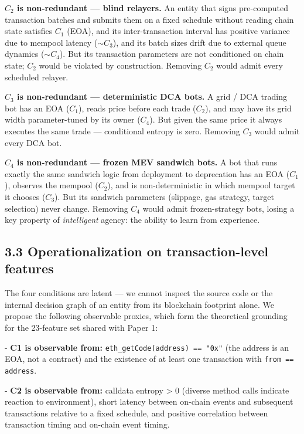 \documentclass[sigconf,nonacm=false]{acmart}
\begin{document}
\textbf{$C_2$ is non-redundant --- blind relayers.} An entity that signs pre-computed transaction batches and submits them on a fixed schedule without reading chain state satisfies $C_1$ (EOA), and its inter-transaction interval has positive variance due to mempool latency ($\sim C_3$), and its batch sizes drift due to external queue dynamics ($\sim C_4$). But its transaction parameters are not conditioned on chain state; $C_2$ would be violated by construction. Removing $C_2$ would admit every scheduled relayer.

\textbf{$C_3$ is non-redundant --- deterministic DCA bots.} A grid / DCA trading bot has an EOA ($C_1$), reads price before each trade ($C_2$), and may have its grid width parameter-tuned by its owner ($C_4$). But given the same price it always executes the same trade --- conditional entropy is zero. Removing $C_3$ would admit every DCA bot.

\textbf{$C_4$ is non-redundant --- frozen MEV sandwich bots.} A bot that runs exactly the same sandwich logic from deployment to deprecation has an EOA ($C_1$), observes the mempool ($C_2$), and is non-deterministic in which mempool target it chooses ($C_3$). But its sandwich parameters (slippage, gas strategy, target selection) never change. Removing $C_4$ would admit frozen-strategy bots, losing a key property of \textit{intelligent} agency: the ability to learn from experience.

\subsection{3.3 Operationalization on transaction-level features}

The four conditions are latent --- we cannot inspect the source code or the internal decision graph of an entity from its blockchain footprint alone. We propose the following observable proxies, which form the theoretical grounding for the 23-feature set shared with Paper 1:

- \textbf{C1 is observable from:} \texttt{eth\_getCode(address) == "0x"} (the address is an EOA, not a contract) and the existence of at least one transaction with \texttt{from == address}.

- \textbf{C2 is observable from:} calldata entropy > 0 (diverse method calls indicate reaction to environment), short latency between on-chain events and subsequent transactions relative to a fixed schedule, and positive correlation between transaction timing and on-chain event timing.
\end{document}
